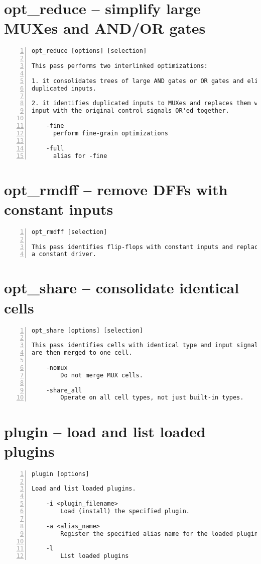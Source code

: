 \section{opt\_reduce -- simplify large MUXes and AND/OR gates}
\label{cmd:opt_reduce}
\begin{lstlisting}[numbers=left,frame=single]
    opt_reduce [options] [selection]

This pass performs two interlinked optimizations:

1. it consolidates trees of large AND gates or OR gates and eliminates
duplicated inputs.

2. it identifies duplicated inputs to MUXes and replaces them with a single
input with the original control signals OR'ed together.

    -fine
      perform fine-grain optimizations

    -full
      alias for -fine
\end{lstlisting}

\section{opt\_rmdff -- remove DFFs with constant inputs}
\label{cmd:opt_rmdff}
\begin{lstlisting}[numbers=left,frame=single]
    opt_rmdff [selection]

This pass identifies flip-flops with constant inputs and replaces them with
a constant driver.
\end{lstlisting}

\section{opt\_share -- consolidate identical cells}
\label{cmd:opt_share}
\begin{lstlisting}[numbers=left,frame=single]
    opt_share [options] [selection]

This pass identifies cells with identical type and input signals. Such cells
are then merged to one cell.

    -nomux
        Do not merge MUX cells.

    -share_all
        Operate on all cell types, not just built-in types.
\end{lstlisting}

\section{plugin -- load and list loaded plugins}
\label{cmd:plugin}
\begin{lstlisting}[numbers=left,frame=single]
    plugin [options]

Load and list loaded plugins.

    -i <plugin_filename>
        Load (install) the specified plugin.

    -a <alias_name>
        Register the specified alias name for the loaded plugin

    -l
        List loaded plugins
\end{lstlisting}

